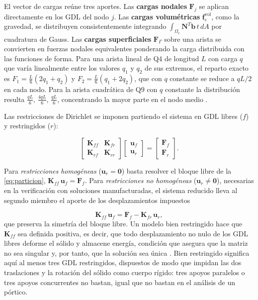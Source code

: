 El vector de cargas reúne tres aportes. Las \textbf{cargas nodales} $\bm{F}_j$ se aplican directamente en los GDL del nodo $j$. Las \textbf{cargas volumétricas} $\bm{f}_e^{\text{vol}}$, como la gravedad, se distribuyen consistentemente integrando $\int_{\Omega_e} \bm{N}^T \bm{b}\, t\, dA$ por cuadratura de Gauss. Las \textbf{cargas superficiales} $\bm{F}_\Gamma$ sobre una arista se convierten en fuerzas nodales equivalentes ponderando la carga distribuida con las funciones de forma. Para una arista lineal de Q4 de longitud $L$ con carga $q$ que varía linealmente entre los valores $q_1$ y $q_2$ de sus extremos, el reparto exacto es $F_1 = \tfrac{L}{6}(2q_1 + q_2)$ y $F_2 = \tfrac{L}{6}(q_1 + 2q_2)$, que con $q$ constante se reduce a $qL/2$ en cada nodo. Para la arista cuadrática de Q9 con $q$ constante la distribución resulta $\tfrac{qL}{6},\,\tfrac{4qL}{6},\,\tfrac{qL}{6}$, concentrando la mayor parte en el nodo medio \autocite[p.~113]{cook2002concepts}.

Las restricciones de Dirichlet se imponen partiendo el sistema en GDL libres ($f$) y restringidos ($r$):

\begin{equation}
\begin{bmatrix} \bm{K}_{ff} & \bm{K}_{fr} \\ \bm{K}_{rf} & \bm{K}_{rr} \end{bmatrix}
\begin{bmatrix} \bm{u}_f \\ \bm{u}_r \end{bmatrix}
=
\begin{bmatrix} \bm{F}_f \\ \bm{F}_r \end{bmatrix}.
\label{eq:particion}
\end{equation}

Para \emph{restricciones homogéneas} ($\bm{u}_r = \bm{0}$) basta resolver el bloque libre de la \autoref{eq:particion}, $\bm{K}_{ff}\,\bm{u}_f = \bm{F}_f$. Para \emph{restricciones no homogéneas} ($\bm{u}_r \neq \bm{0}$), necesarias en la verificación con soluciones manufacturadas, el sistema reducido lleva al segundo miembro el aporte de los desplazamientos impuestos

\begin{equation}
\bm{K}_{ff}\,\bm{u}_f = \bm{F}_f - \bm{K}_{fr}\,\bm{u}_r,
\label{eq:dirichlet-no-homogeneo}
\end{equation}
que preserva la simetría del bloque libre. Un modelo bien restringido hace que $\bm{K}_{ff}$ sea definida positiva, es decir, que todo desplazamiento no nulo de los GDL libres deforme el sólido y almacene energía, condición que asegura que la matriz no sea singular y, por tanto, que la solución sea única \autocite[pp.~726-727]{bathe2014fem}. Bien restringido significa aquí al menos tres GDL restringidos, dispuestos de modo que impidan las dos traslaciones y la rotación del sólido como cuerpo rígido: tres apoyos paralelos o tres apoyos concurrentes no bastan, igual que no bastan en el análisis de un pórtico.

